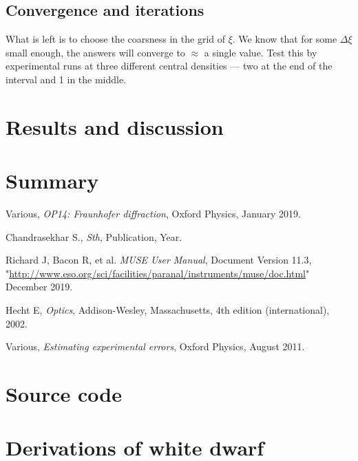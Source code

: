 \documentclass[]{article}
\begin{document}
\subsection{Convergence and iterations}
	What is left is to choose the coarsness in the grid of $\xi$. We know that for some $\Delta \xi$ small enough, the answers will converge to $\approx$ a single value. Test this by experimental runs at three different central densities --- two at the end of the interval and 1 in the middle.

\section{Results and discussion}\label{sec:results-and-discussion}


\section{Summary}\label{sec:summary}

	\begin{thebibliography}{9}
		
		Various,
		\textit{OP14: Fraunhofer diffraction},
		Oxford Physics,
		January 2019.	
		
		Chandrasekhar S.,
		\textit{Sth},
		Publication,
		Year.

		Richard J, Bacon R, et al.
		\textit{MUSE User Manual},
		Document Version 11.3,
		"\url{http://www.eso.org/sci/facilities/paranal/instruments/muse/doc.html}"
		December 2019.
		
		Hecht E,
		\textit{Optics},
		Addison-Wesley, Massachusetts,
		4th edition (international),
		2002.
		
		Various,
		\textit{Estimating experimental errors},
		Oxford Physics,
		August 2011.
		
	\end{thebibliography}

\appendix
\section{Source code}
\section{Derivations of white dwarf}
\end{document}
